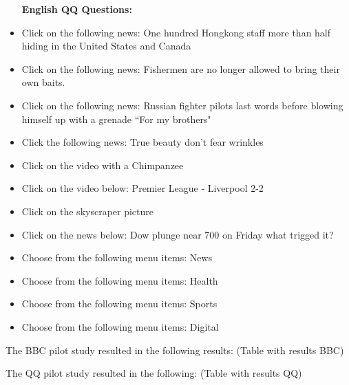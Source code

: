 \begin{itemize}
	\item [\textbf{English QQ Questions:}]
	
	\item Click on the following news: One hundred Hongkong staff more than half hiding in the United States and Canada
	
	\item Click on the following news: Fishermen are no longer allowed to bring their own baits.
	
	\item Click on the following news: Russian fighter pilots last words before blowing himself up with a grenade “For my brothers"
		
	\item Click the following news: True beauty don’t fear wrinkles
		
	\item Click on the video with a Chimpanzee
	
	\item Click on the video below: Premier League - Liverpool 2-2
		
	\item Click on the skyscraper picture
		
	\item Click on the news below: Dow plunge near 700 on Friday what trigged it?
		
	\item Choose from the following menu items: News
		
	\item Choose from the following menu items: Health
		
	\item Choose from the following menu items: Sports
	
	\item Choose from the following menu items: Digital
\end{itemize}
The BBC pilot study resulted in the following results: (Table with results BBC)



The QQ pilot study resulted in the following: (Table with results QQ)
